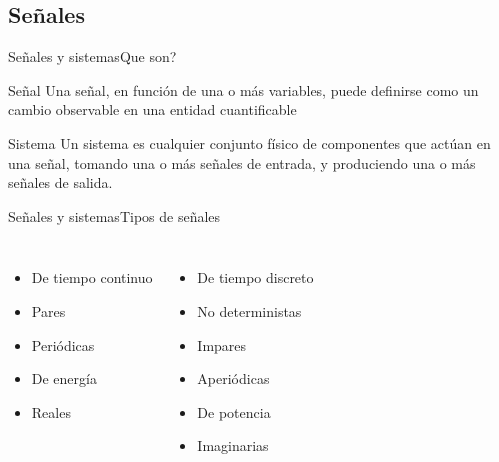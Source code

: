     \subsection{Señales}
    \begin{frame}{Señales y sistemas}{Que son?}
      \begin{block}{Señal}
         Una señal, en función de una o más variables, puede definirse como un cambio observable en una entidad cuantificable
      \end{block}
      \begin{block}{Sistema}
         Un sistema es cualquier conjunto físico de componentes que actúan en una señal, tomando una o más señales de entrada, y produciendo una o más señales de salida.
      \end{block}
    \end{frame}
    \begin{frame}{Señales y sistemas}{Tipos de señales}
      \begin{columns}[onlytextwidth]
            \begin{itemize}
               \item{De tiempo continuo}
               \item{Pares}
               \item{Periódicas}
               \item{De energía}
               \item{Reales}
            \end{itemize}
            \begin{itemize}
               \item{De tiempo discreto}
               \item{No deterministas}
               \item{Impares}
               \item{Aperiódicas}
               \item{De potencia}
               \item{Imaginarias}
            \end{itemize}
      \end{columns}
    \end{frame}

